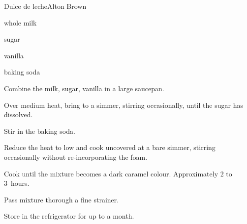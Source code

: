 \begin{recipe}{Dulce de leche}{Alton Brown}{}

\begin{ingredients}
\item {} whole milk
\item {} sugar
\item {} vanilla
\item \tp{\half} baking soda
\end{ingredients}

\begin{directions}
\item Combine the milk, sugar, vanilla in a large saucepan.
\item Over medium heat, bring to a simmer, stirring occasionally, until the sugar has dissolved.
\item Stir in the baking soda.
\item Reduce the heat to low and cook uncovered at a bare simmer, stirring occasionally without re-incorporating the foam.
\item Cook until the mixture becomes a dark caramel colour. Approximately 2\half{} to 3~hours.
\item Pass mixture thorough a fine strainer.
\item Store in the refrigerator for up to a month.
\end{directions}
\end{recipe}
